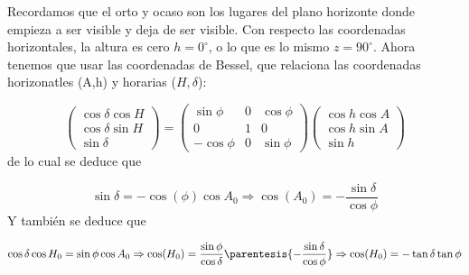 
	Recordamos que el orto y ocaso son los lugares del plano horizonte donde empieza a ser visible y deja de ser visible. Con respecto las coordenadas horizontales, la altura es cero $h=0^\circ$, o lo que es lo mismo $z=90^\circ$. Ahora tenemos que usar las coordenadas de Bessel, que relaciona las coordenadas horizonatles (A,h) y horarias ($H,\delta$):
	
	\begin{equation}
	\begin{pmatrix}
		\cos \delta \cos H \\
		\cos \delta \sin H \\
		\sin \delta
	\end{pmatrix} =\begin{pmatrix}
		\sin \phi & 0 & \cos \phi \\
		0 & 1 & 0 \\
		- \cos \phi & 0 & \sin \phi
	\end{pmatrix}
	\begin{pmatrix}
		\cos h \cos A \\
		\cos h \sin A \\
		\sin h
	\end{pmatrix}
	\end{equation}
	de lo cual se deduce que
	
	\begin{equation}
	\sin \delta = - \cos (\phi) \cos A_0  \Rightarrow \cos (A_0) = - \frac{\sin \delta}{\cos \phi}
	\end{equation}
	Y también se deduce que
	
	\begin{equation}
	\cos \delta \cos H_0 = \sin \phi \cos A_0 \Rightarrow \cos (H_0) = \frac{\sin \phi}{\cos \delta} \parentesis{ - \frac{\sin \delta}{\cos \phi}} \Rightarrow \cos (H_0) = - \tan \delta \tan \phi
	\end{equation}
